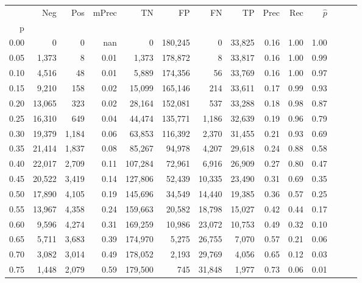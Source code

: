 \begin{tabular}{rrrrrrrrrrrrrr}
\toprule
{} &     Neg &    Pos & mPrec &       TN &       FP &      FN &      TP &  Prec &   Rec & $\hat{p}$ \\
p    &         &        &       &          &          &         &         &       &       &           \\
\midrule
0.00 &       0 &      0 &   nan &        0 &  180,245 &       0 &  33,825 &  0.16 &  1.00 &      1.00 \\
0.05 &   1,373 &      8 &  0.01 &    1,373 &  178,872 &       8 &  33,817 &  0.16 &  1.00 &      0.99 \\
0.10 &   4,516 &     48 &  0.01 &    5,889 &  174,356 &      56 &  33,769 &  0.16 &  1.00 &      0.97 \\
0.15 &   9,210 &    158 &  0.02 &   15,099 &  165,146 &     214 &  33,611 &  0.17 &  0.99 &      0.93 \\
0.20 &  13,065 &    323 &  0.02 &   28,164 &  152,081 &     537 &  33,288 &  0.18 &  0.98 &      0.87 \\
0.25 &  16,310 &    649 &  0.04 &   44,474 &  135,771 &   1,186 &  32,639 &  0.19 &  0.96 &      0.79 \\
0.30 &  19,379 &  1,184 &  0.06 &   63,853 &  116,392 &   2,370 &  31,455 &  0.21 &  0.93 &      0.69 \\
0.35 &  21,414 &  1,837 &  0.08 &   85,267 &   94,978 &   4,207 &  29,618 &  0.24 &  0.88 &      0.58 \\
0.40 &  22,017 &  2,709 &  0.11 &  107,284 &   72,961 &   6,916 &  26,909 &  0.27 &  0.80 &      0.47 \\
0.45 &  20,522 &  3,419 &  0.14 &  127,806 &   52,439 &  10,335 &  23,490 &  0.31 &  0.69 &      0.35 \\
0.50 &  17,890 &  4,105 &  0.19 &  145,696 &   34,549 &  14,440 &  19,385 &  0.36 &  0.57 &      0.25 \\
0.55 &  13,967 &  4,358 &  0.24 &  159,663 &   20,582 &  18,798 &  15,027 &  0.42 &  0.44 &      0.17 \\
0.60 &   9,596 &  4,274 &  0.31 &  169,259 &   10,986 &  23,072 &  10,753 &  0.49 &  0.32 &      0.10 \\
0.65 &   5,711 &  3,683 &  0.39 &  174,970 &    5,275 &  26,755 &   7,070 &  0.57 &  0.21 &      0.06 \\
0.70 &   3,082 &  3,014 &  0.49 &  178,052 &    2,193 &  29,769 &   4,056 &  0.65 &  0.12 &      0.03 \\
0.75 &   1,448 &  2,079 &  0.59 &  179,500 &      745 &  31,848 &   1,977 &  0.73 &  0.06 &      0.01 \\

\end{tabular}
